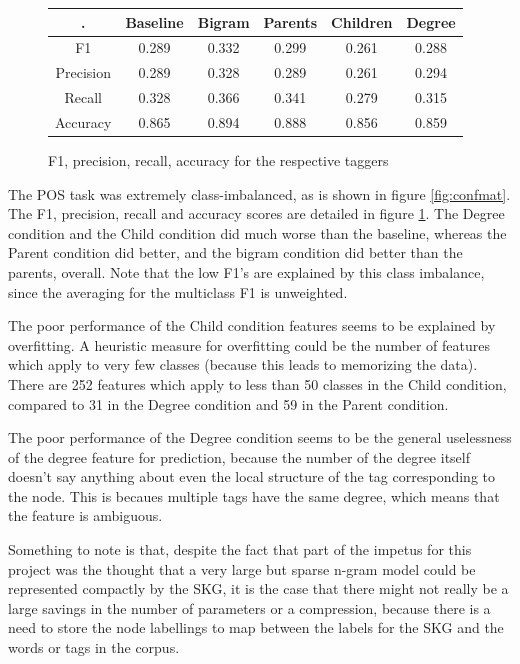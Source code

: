 \documentclass[12pt]{article}
\begin{document}
\begin{figure}
  \begin{tabular}{c || c | c | c | c | c}
    \hline
    . & Baseline & Bigram & Parents & Children & Degree \\
    \hline
    F1 & 0.289 & 0.332 & 0.299 & 0.261 & 0.288 \\
    Precision & 0.289 & 0.328 & 0.289 & 0.261 & 0.294 \\
    Recall & 0.328 & 0.366 & 0.341 & 0.279 & 0.315 \\
    Accuracy & 0.865 & 0.894 & 0.888 & 0.856 & 0.859 \\
    \hline
  \end{tabular}
  \caption{F1, precision, recall, accuracy for the respective taggers}
  \label{fig:f1s}
\end{figure}

The POS task was extremely class-imbalanced, as is shown in figure \ref{fig:confmat}. The F1, precision, recall and accuracy scores are detailed in figure \ref{fig:f1s}. The Degree condition and the Child condition did much worse than the baseline, whereas the Parent condition did better, and the bigram condition did better than the parents, overall. Note that the low F1's are explained by this class imbalance, since the averaging for the multiclass F1 is unweighted.

The poor performance of the Child condition features seems to be explained by overfitting. A heuristic measure for overfitting could be the number of features which apply to very few classes (because this leads to memorizing the data). There are 252 features which apply to less than 50 classes in the Child condition, compared to 31 in the Degree condition and 59 in the Parent condition.

The poor performance of the Degree condition seems to be the general uselessness of the degree feature for prediction, because the number of the degree itself doesn't say anything about even the local structure of the tag corresponding to the node. This is becaues multiple tags have the same degree, which means that the feature is ambiguous.

Something to note is that, despite the fact that part of the impetus for this project was the thought that a very large but sparse n-gram model could be represented compactly by the SKG, it is the case that there might not really be a large savings in the number of parameters or a compression, because there is a need to store the node labellings to map between the labels for the SKG and the words or tags in the corpus.
\end{document}
